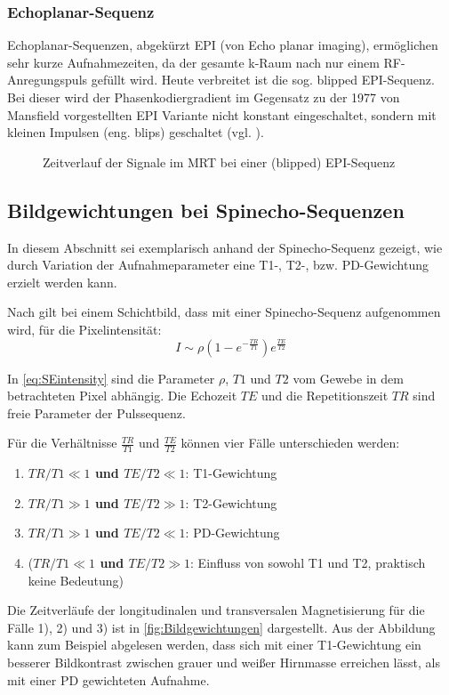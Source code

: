 \subsubsection{Echoplanar-Sequenz}
Echoplanar-Sequenzen, abgekürzt EPI (von Echo planar imaging), ermöglichen sehr kurze Aufnahmezeiten, da der gesamte k-Raum nach nur einem RF-Anregungspuls gefüllt wird. Heute verbreitet ist die sog. blipped EPI-Sequenz. Bei dieser wird der Phasenkodiergradient im Gegensatz zu der 1977 von Mansfield vorgestellten EPI Variante nicht konstant eingeschaltet, sondern mit kleinen Impulsen (eng. blips) geschaltet (vgl. \cite[S.~299]{Bushong2014}).

\begin{figure}[H]
	\centering
	\caption[Echoplanar Sequenz]{Zeitverlauf der Signale im MRT bei einer (blipped) EPI-Sequenz}
	\label{fig:EPIseq}
\end{figure}



\subsection{Bildgewichtungen bei Spinecho-Sequenzen}
\label{sec:gewichtung}
In diesem Abschnitt sei exemplarisch anhand der Spinecho-Sequenz gezeigt, wie durch Variation der Aufnahmeparameter eine T1-, T2-, bzw. PD-Gewichtung erzielt werden kann.

Nach \cite{Bushberg2011} gilt bei einem Schichtbild, dass mit einer Spinecho-Sequenz aufgenommen wird, für die Pixelintensität:
\begin{equation}
\label{eq:SEintensity}
	I \sim \rho \left(1-e^{-\frac{TR}{T1}}\right) e^{\frac{TE}{T2}}
\end{equation}

In \autoref{eq:SEintensity} sind die Parameter $\rho$, $T1$ und $T2$ vom Gewebe in dem betrachteten Pixel abhängig. Die Echozeit $TE$ und die Repetitionszeit $TR$ sind freie Parameter der Pulssequenz.

Für die Verhältnisse $\frac{TR}{T1}$ und $\frac{TE}{T2}$ können vier Fälle unterschieden werden:

\begin{enumerate}
	\item \textbf{$TR/T1\ll1$ und $TE/T2\ll1$}: T1-Gewichtung
	\item \textbf{$TR/T1\gg1$ und $TE/T2\gg1$}: T2-Gewichtung
	\item \textbf{$TR/T1\gg1$ und $TE/T2\ll1$}: PD-Gewichtung
	\item (\textbf{$TR/T1\ll1$ und $TE/T2\gg1$}: Einfluss von sowohl T1 und T2, praktisch keine Bedeutung)
\end{enumerate}
Die Zeitverläufe der longitudinalen und transversalen Magnetisierung für die Fälle 1), 2) und 3) ist in \autoref{fig:Bildgewichtungen} dargestellt. Aus der Abbildung kann zum Beispiel abgelesen werden, dass sich mit einer T1-Gewichtung ein besserer Bildkontrast zwischen grauer und weißer Hirnmasse erreichen lässt, als mit einer PD gewichteten Aufnahme.

